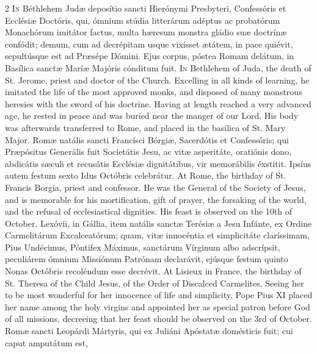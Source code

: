 \begin{paracol}{2}
\lettrine[lines=2]{I}{n} Béthlehem Judæ 
 deposítio sancti Hierónymi Presbyteri, Confessóris et Ecclésiæ Doctóris, 
 qui, ómnium stúdia litterárum adéptus ac probatórum Monachórum imitátor 
 factus, multa hæresum monstra gládio suæ doctrínæ confódit; demum, cum ad 
 decrépitam usque vixísset ætátem, in pace quiévit, sepultúsque est ad 
 Præsépe Dómini. Ejus corpus, póstea Romam delátum, in Basílica sanctæ 
 Maríæ Majóris cónditum fuit.
\switchcolumn
{}
\lettrine[lines=2]{I}{n} Bethlehem of Juda, the death of 
 St. Jerome, priest and doctor of the Church. Excelling in all kinds of 
 learning, he imitated the life of the most approved monks, and disposed of 
 many monstrous heresies with the sword of his doctrine. Having at 
 length reached a very advanced age, he rested in peace and was buried near 
 the manger of our Lord. His body was afterwards transferred to Rome, 
 and placed in the basilica of St. Mary Major.
\switchcolumn*
{}
Romæ natális sancti 
 Francísci Bórgiæ, Sacerdótis et Confessóris; qui Præpósitus Generális fuit 
 Societátis Jesu, ac vitæ asperitáte, oratiónis dono, abdicátis sæculi et 
 recusátis Ecclésiæ dignitátibus, vir memorábilis éxstitit. Ipsíus 
 autem festum sexto Idus Octóbris celebrátur.
\switchcolumn
{}
At Rome, the birthday of St. Francis 
 Borgia, priest and confessor. He was the General of the Society of 
 Jesus, and is memorable for his mortification, gift of prayer, the forsaking 
 of the world, and the refusal of ecclesiastical dignities. His feast 
 is observed on the 10th of October.
\switchcolumn*
{}
Lexóvii, in Gállia, 
 item natális sanctæ Terésiæ a Jesu Infánte, ex Ordine Carmelitárum 
 Excalceatórum; quam, vitæ innocéntia et simplicitáte claríssimam, Pius 
 Undécimus, Póntifex Máximus, sanctárum Vírginum albo adscrípsit, peculiárem 
 ómnium Missiónum Patrónam declarávit, ejúsque festum quinto Nonas Octóbris 
 recoléndum esse decrévit.
\switchcolumn
{}
At Lisieux in France, the birthday 
 of St. Theresa of the Child Jesus, of the Order of Discalced Carmelites. 
 Seeing her to be most wonderful for her innocence of life and simplicity, 
 Pope Pius XI placed her name among the holy virgins and appointed her as 
 special patron before God of all missions, decreeing that her feast should 
 be observed on the 3rd of October.
\switchcolumn*
{}
Romæ sancti Leopárdi 
 Mártyris, qui ex Juliáni Apóstatæ domésticis fuit; cui caput amputátum est, 

\end{paracol}
